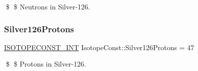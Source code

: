 \$ \$ Neutrons in Silver-\/126. \mbox{\label{group___isotope_const-_silver-_ag126_gacfd6af47296971c52b9164ee5d118f49}} 
\subsubsection{\texorpdfstring{Silver126\+Protons}{Silver126Protons}}
{\footnotesize\ttfamily \mbox{\hyperlink{group___isotope_const-_macros_ga5f18360b3e99483a35c32d789e62621c}{I\+S\+O\+T\+O\+P\+E\+C\+O\+N\+S\+T\+\_\+\+I\+NT}} Isotope\+Const\+::\+Silver126\+Protons = 47}

\$ \$ Protons in Silver-\/126. 